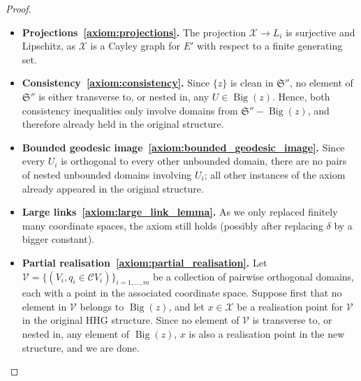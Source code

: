 \documentclass[svgnames]{amsart}
\theoremstyle{plain}
\theoremstyle{definition}
\newcommand{\cal}[1]{\mathcal{#1}}
\newcommand{\frakS}{\mathfrak{S}}
\newcommand{\C}{\cal C}
\newcommand{\Bigdom}[1]{\operatorname{Big}\left(#1\right)}
\begin{document}
\begin{proof}
    \begin{itemize}
        \item \textbf{Projections~\ref{axiom:projections}.} The projection $\cal X\to L_i$ is surjective and Lipschitz, as $\cal X$ is a Cayley graph for $E'$ with respect to a finite generating set.
        \item \textbf{Consistency~\ref{axiom:consistency}.} Since $\{z\}$ is clean in $\frakS''$, no element of $\frakS''$ is either transverse to, or nested in, any $U\in \Bigdom{z}$. Hence, both consistency inequalities only involve domains from $\frakS''-\Bigdom{z}$, and therefore already held in the original structure.
        \item \textbf{Bounded geodesic image~\ref{axiom:bounded_geodesic_image}.} Since every $U_i$ is orthogonal to every other unbounded domain, there are no pairs of nested unbounded domains involving $U_i$; all other instances of the axiom already appeared in the original structure.
        \item \textbf{Large links~\ref{axiom:large_link_lemma}.} As we only replaced finitely many coordinate spaces, the axiom still holds (possibly after replacing $\delta$ by a bigger constant).
        \item \textbf{Partial realisation~\ref{axiom:partial_realisation}.} Let $\cal V= \{(V_i,q_i\in \C V_i)\}_{i=1,\ldots,m}$ be a collection of pairwise orthogonal domains, each with a point in the associated coordinate space. Suppose first that no element in $\cal V$ belongs to $\Bigdom{z}$, and let $x\in \cal X$ be a realisation point for $\cal V$ in the original HHG structure. Since no element of $\cal V$ is transverse to, or nested in, any element of $\Bigdom{z}$, $x$ is also a realisation point in the new structure, and we are done.


\end{itemize}
\end{proof}
\end{document}

